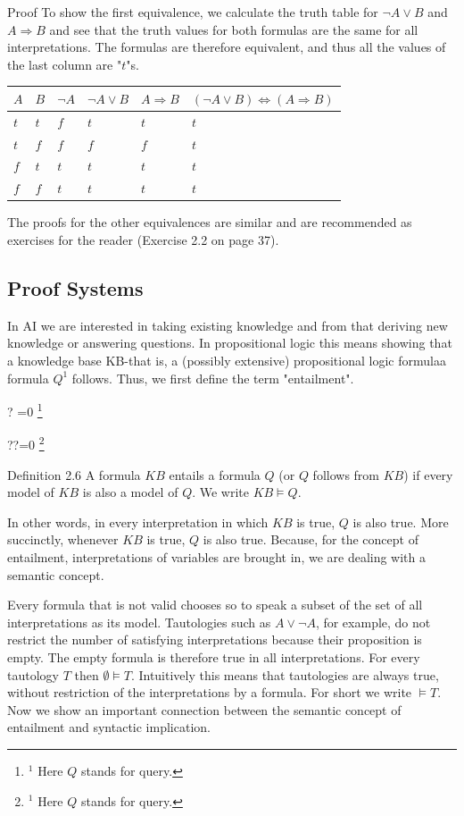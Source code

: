 \documentclass[10pt]{book}
\let\svthefootnote\thefootnote
\newcommand\blfootnotetext[1]{%
  \let\thefootnote\relax\footnote{#1}%
  \addtocounter{footnote}{-1}%
  \let\thefootnote\svthefootnote%
}
\let\svfootnotetext\footnotetext
\renewcommand\footnotetext[2][?]{%
  \if\relax#1\relax%
    \ifnum\value{footnote}=0\blfootnotetext{#2}\else\svfootnotetext{#2}\fi%
  \else%
    \if?#1\ifnum\value{footnote}=0\blfootnotetext{#2}\else\svfootnotetext{#2}\fi%
    \else\svfootnotetext[#1]{#2}\fi%
  \fi
}
\begin{document}
Proof To show the first equivalence, we calculate the truth table for $\neg A \vee B$ and $A \Rightarrow B$ and see that the truth values for both formulas are the same for all interpretations. The formulas are therefore equivalent, and thus all the values of the last column are "$t$"s.

\begin{center}
\begin{tabular}{llllll}
\hline
$A$ & $B$ & $\neg A$ & $\neg A \vee B$ & $A \Rightarrow B$ & $(\neg A \vee B) \Leftrightarrow (A \Rightarrow B)$ \\
\hline
$t$ & $t$ & $f$ & $t$ & $t$ & $t$ \\
\hline
$t$ & $f$ & $f$ & $f$ & $f$ & $t$ \\
\hline
$f$ & $t$ & $t$ & $t$ & $t$ & $t$ \\
\hline
$f$ & $f$ & $t$ & $t$ & $t$ & $t$ \\
\hline
\end{tabular}
\end{center}

The proofs for the other equivalences are similar and are recommended as exercises for the reader (Exercise 2.2 on page 37).

\subsection{Proof Systems}
In AI we are interested in taking existing knowledge and from that deriving new knowledge or answering questions. In propositional logic this means showing that a knowledge base KB-that is, a (possibly extensive) propositional logic formulaa formula $Q^{1}$ follows. Thus, we first define the term "entailment".

Definition 2.6 A formula $K B$ entails a formula $Q$ (or $Q$ follows from $K B$) if every model of $K B$ is also a model of $Q$. We write $K B \models Q$.

In other words, in every interpretation in which $K B$ is true, $Q$ is also true. More succinctly, whenever $K B$ is true, $Q$ is also true. Because, for the concept of entailment, interpretations of variables are brought in, we are dealing with a semantic concept.

Every formula that is not valid chooses so to speak a subset of the set of all interpretations as its model. Tautologies such as $A \vee \neg A$, for example, do not restrict the number of satisfying interpretations because their proposition is empty. The empty formula is therefore true in all interpretations. For every tautology $T$ then $\emptyset \models T$. Intuitively this means that tautologies are always true, without restriction of the interpretations by a formula. For short we write $\models T$. Now we show an important connection between the semantic concept of entailment and syntactic implication.
\end{document}
